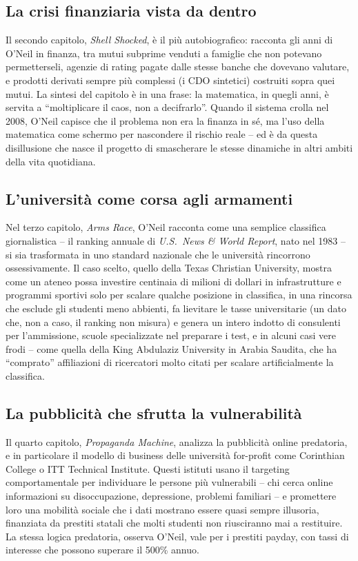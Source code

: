 \documentclass[a4paper,11pt]{article}
\begin{document}
\subsection{La crisi finanziaria vista da dentro}

Il secondo capitolo, \emph{Shell Shocked}, è il più autobiografico: racconta gli anni di O'Neil in finanza, tra mutui subprime venduti a famiglie che non potevano permetterseli, agenzie di rating pagate dalle stesse banche che dovevano valutare, e prodotti derivati sempre più complessi (i CDO sintetici) costruiti sopra quei mutui. La sintesi del capitolo è in una frase: la matematica, in quegli anni, è servita a ``moltiplicare il caos, non a decifrarlo''. Quando il sistema crolla nel 2008, O'Neil capisce che il problema non era la finanza in sé, ma l'uso della matematica come schermo per nascondere il rischio reale -- ed è da questa disillusione che nasce il progetto di smascherare le stesse dinamiche in altri ambiti della vita quotidiana.

\subsection{L'università come corsa agli armamenti}

Nel terzo capitolo, \emph{Arms Race}, O'Neil racconta come una semplice classifica giornalistica -- il ranking annuale di \emph{U.S.\ News \& World Report}, nato nel 1983 -- si sia trasformata in uno standard nazionale che le università rincorrono ossessivamente. Il caso scelto, quello della Texas Christian University, mostra come un ateneo possa investire centinaia di milioni di dollari in infrastrutture e programmi sportivi solo per scalare qualche posizione in classifica, in una rincorsa che esclude gli studenti meno abbienti, fa lievitare le tasse universitarie (un dato che, non a caso, il ranking non misura) e genera un intero indotto di consulenti per l'ammissione, scuole specializzate nel preparare i test, e in alcuni casi vere frodi -- come quella della King Abdulaziz University in Arabia Saudita, che ha ``comprato'' affiliazioni di ricercatori molto citati per scalare artificialmente la classifica.

\subsection{La pubblicità che sfrutta la vulnerabilità}

Il quarto capitolo, \emph{Propaganda Machine}, analizza la pubblicità online predatoria, e in particolare il modello di business delle università for-profit come Corinthian College o ITT Technical Institute. Questi istituti usano il targeting comportamentale per individuare le persone più vulnerabili -- chi cerca online informazioni su disoccupazione, depressione, problemi familiari -- e promettere loro una mobilità sociale che i dati mostrano essere quasi sempre illusoria, finanziata da prestiti statali che molti studenti non riusciranno mai a restituire. La stessa logica predatoria, osserva O'Neil, vale per i prestiti payday, con tassi di interesse che possono superare il 500\% annuo.
\end{document}
